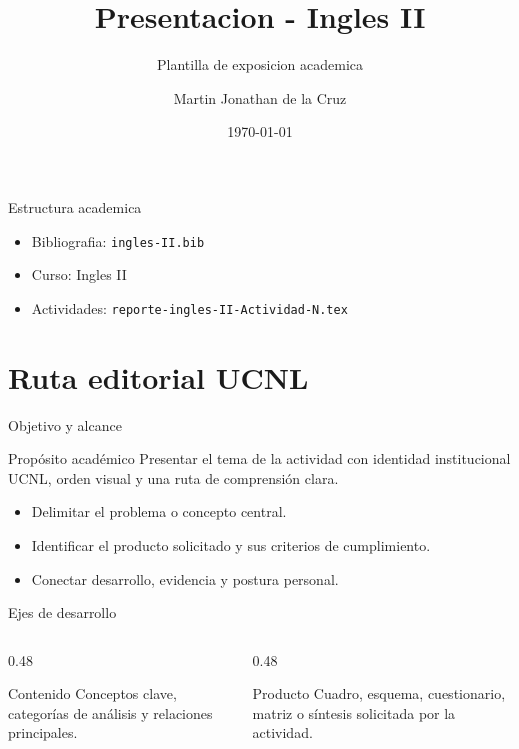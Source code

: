 ﻿\documentclass[spanish,aspectratio=169]{beamer}
\title{Presentacion - Ingles II}
\subtitle{Plantilla de exposicion academica}
\author{Martin Jonathan de la Cruz}
\institute{Universidad Ciudadana de Nuevo Leon}
\date{\today}
\begin{document}
\begin{frame}
  \titlepage
\end{frame}

\begin{frame}{Estructura academica}
  \begin{itemize}
    \item Bibliografia: \texttt{ingles-II.bib}
    \item Curso: Ingles II
    \item Actividades: \texttt{reporte-ingles-II-Actividad-N.tex}
  \end{itemize}
\end{frame}


\section{Ruta editorial UCNL}

\begin{frame}{Objetivo y alcance}
  \begin{block}{Propósito académico}
    Presentar el tema de la actividad con identidad institucional UCNL, orden visual y una ruta de comprensión clara.
  \end{block}
  \begin{itemize}
    \item Delimitar el problema o concepto central.
    \item Identificar el producto solicitado y sus criterios de cumplimiento.
    \item Conectar desarrollo, evidencia y postura personal.
  \end{itemize}
\end{frame}

\begin{frame}{Ejes de desarrollo}
  \begin{columns}[T,totalwidth=\textwidth]
    \begin{column}{0.48\textwidth}
      \begin{block}{Contenido}
        Conceptos clave, categorías de análisis y relaciones principales.
      \end{block}
    \end{column}
    \begin{column}{0.48\textwidth}
      \begin{block}{Producto}
        Cuadro, esquema, cuestionario, matriz o síntesis solicitada por la actividad.
      \end{block}
    \end{column}
  \end{columns}
\end{frame}
\end{document}
